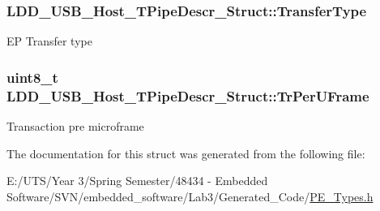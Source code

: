 \subsubsection[{Transfer\+Type}]{ L\+D\+D\+\_\+\+U\+S\+B\+\_\+\+Host\+\_\+\+T\+Pipe\+Descr\+\_\+\+Struct\+::\+Transfer\+Type}\label{struct_l_d_d___u_s_b___host___t_pipe_descr___struct_a42bf0ec64bda6f7f31d32e3f4cd5df13}
E\+P Transfer type \hypertarget{struct_l_d_d___u_s_b___host___t_pipe_descr___struct_adb11454d0380a421cf7ab4fc225e5c41}{}
\subsubsection[{Tr\+Per\+U\+Frame}]{\setlength{\rightskip}{0pt plus 5cm}uint8\+\_\+t L\+D\+D\+\_\+\+U\+S\+B\+\_\+\+Host\+\_\+\+T\+Pipe\+Descr\+\_\+\+Struct\+::\+Tr\+Per\+U\+Frame}\label{struct_l_d_d___u_s_b___host___t_pipe_descr___struct_adb11454d0380a421cf7ab4fc225e5c41}
Transaction pre microframe 

The documentation for this struct was generated from the following file\+:\begin{DoxyCompactItemize}
\item 
E\+:/\+U\+T\+S/\+Year 3/\+Spring Semester/48434 -\/ Embedded Software/\+S\+V\+N/embedded\+\_\+software/\+Lab3/\+Generated\+\_\+\+Code/\hyperlink{_p_e___types_8h}{P\+E\+\_\+\+Types.\+h}\end{DoxyCompactItemize}
